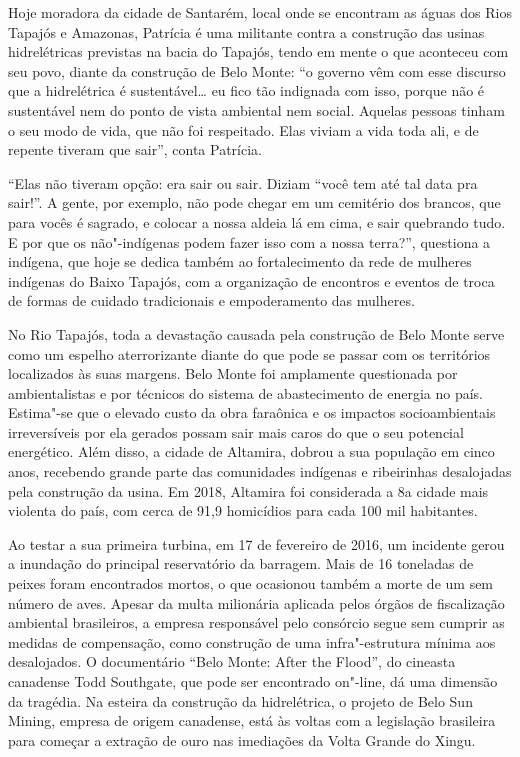Hoje moradora da cidade de Santarém, local onde se encontram as águas
dos Rios Tapajós e Amazonas, Patrícia é uma militante contra a
construção das usinas hidrelétricas previstas na bacia do Tapajós, tendo
em mente o que aconteceu com seu povo, diante da construção de Belo
Monte: ``o governo vêm com esse discurso que a hidrelétrica é
sustentável\ldots{} eu fico tão indignada com isso, porque não é
sustentável nem do ponto de vista ambiental nem social. Aquelas pessoas
tinham o seu modo de vida, que não foi respeitado. Elas viviam a vida
toda ali, e de repente tiveram que sair'', conta Patrícia.

``Elas não tiveram opção: era sair ou sair. Diziam ``você tem até tal
data pra sair!''. A gente, por exemplo, não pode chegar em um cemitério
dos brancos, que para vocês é sagrado, e colocar a nossa aldeia lá em
cima, e sair quebrando tudo. E por que os não"-indígenas podem fazer isso
com a nossa terra?'', questiona a indígena, que hoje se dedica também ao
fortalecimento da rede de mulheres indígenas do Baixo Tapajós, com a
organização de encontros e eventos de troca de formas de cuidado
tradicionais e empoderamento das mulheres.

No Rio Tapajós, toda a devastação causada pela construção de Belo Monte
serve como um espelho aterrorizante diante do que pode se passar com os
territórios localizados às suas margens. Belo Monte foi amplamente
questionada por ambientalistas e por técnicos do sistema de
abastecimento de energia no país. Estima"-se que o elevado custo da obra
faraônica e os impactos socioambientais irreversíveis por ela gerados
possam sair mais caros do que o seu potencial energético. Além disso, a
cidade de Altamira, dobrou a sua população em cinco anos, recebendo
grande parte das comunidades indígenas e ribeirinhas desalojadas pela
construção da usina. Em 2018, Altamira foi considerada a 8a cidade mais
violenta do país, com cerca de 91,9 homicídios para cada 100 mil
habitantes.

Ao testar a sua primeira turbina, em 17 de fevereiro de 2016, um
incidente gerou a inundação do principal reservatório da barragem. Mais
de 16 toneladas de peixes foram encontrados mortos, o que ocasionou
também a morte de um sem número de aves. Apesar da multa milionária
aplicada pelos órgãos de fiscalização ambiental brasileiros, a empresa
responsável pelo consórcio segue sem cumprir as medidas de compensação,
como construção de uma infra"-estrutura mínima aos desalojados. O
documentário ``Belo Monte: After the Flood'', do cineasta canadense Todd
Southgate, que pode ser encontrado on"-line, dá uma dimensão da tragédia.
Na esteira da construção da hidrelétrica, o projeto de Belo Sun Mining,
empresa de origem canadense, está às voltas com a legislação brasileira
para começar a extração de ouro nas imediações da Volta Grande do Xingu.

